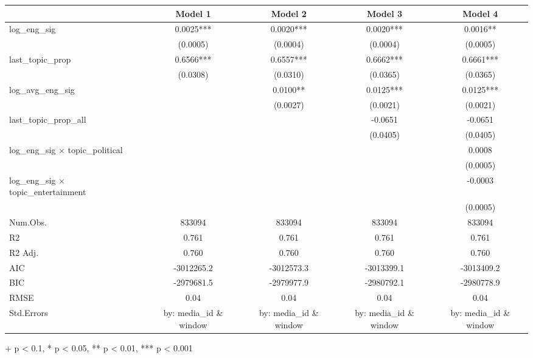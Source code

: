 \setlength{\LTpost}{0mm}
\begin{longtable}{lcccc}
\toprule
  & Model 1 & Model 2 & Model 3 & Model 4 \\ 
\midrule
log\_eng\_sig & 0.0025*** & 0.0020*** & 0.0020*** & 0.0016** \\ 
 & (0.0005) & (0.0004) & (0.0004) & (0.0005) \\ 
last\_topic\_prop & 0.6566*** & 0.6557*** & 0.6662*** & 0.6661*** \\ 
 & (0.0308) & (0.0310) & (0.0365) & (0.0365) \\ 
log\_avg\_eng\_sig &  & 0.0100** & 0.0125*** & 0.0125*** \\ 
 &  & (0.0027) & (0.0021) & (0.0021) \\ 
last\_topic\_prop\_all &  &  & -0.0651 & -0.0651 \\ 
 &  &  & (0.0405) & (0.0405) \\ 
log\_eng\_sig × topic\_political &  &  &  & 0.0008 \\ 
 &  &  &  & (0.0005) \\ 
log\_eng\_sig × topic\_entertainment &  &  &  & -0.0003 \\ 
 &  &  &  & (0.0005) \\ 
Num.Obs. & 833094 & 833094 & 833094 & 833094 \\ 
R2 & 0.761 & 0.761 & 0.761 & 0.761 \\ 
R2 Adj. & 0.760 & 0.760 & 0.760 & 0.760 \\ 
AIC & -3012265.2 & -3012573.3 & -3013399.1 & -3013409.2 \\ 
BIC & -2979681.5 & -2979977.9 & -2980792.1 & -2980778.9 \\ 
RMSE & 0.04 & 0.04 & 0.04 & 0.04 \\ 
Std.Errors & by: media\_id \& window & by: media\_id \& window & by: media\_id \& window & by: media\_id \& window \\ 
\bottomrule
\end{longtable}
\begin{minipage}{\linewidth}
+ p < 0.1, * p < 0.05, ** p < 0.01, *** p < 0.001\\
\end{minipage}

